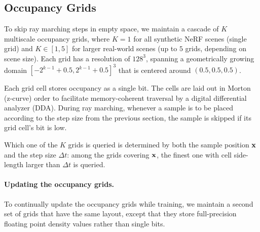 \documentclass[acmtog,authorversion]{acmart}
\begin{document}

\subsection{Occupancy Grids}
To skip ray marching steps in empty space, we maintain a cascade of $K$ multiscale occupancy grids, where ${K=1}$ for all synthetic NeRF scenes (single grid) and ${K\in[1,5]}$ for larger real-world scenes (up to $5$ grids, depending on scene size).
Each grid has a resolution of $128^3$, spanning a geometrically growing domain $[-2^{k-1} + 0.5,2^{k-1} + 0.5]^3$ that is centered around ${(0.5, 0.5, 0.5)}$.

Each grid cell stores occupancy as a single bit.
The cells are laid out in Morton (z-curve) order to facilitate memory-coherent traversal by a digital differential analyzer (DDA).
During ray marching, whenever a sample is to be placed according to the step size from the previous section, the sample is skipped if its grid cell's bit is low.

Which one of the $K$ grids is queried is determined by both the sample position $\mathbf{x}$ and the step size $\Delta t$: among the grids covering $\mathbf{x}$, the finest one with cell side-length larger than $\Delta t$ is queried.

\paragraph{Updating the occupancy grids.}
To continually update the occupancy grids while training, we maintain a second set of grids that have the same layout, except that they store full-precision floating point density values rather than single bits.
\end{document}

